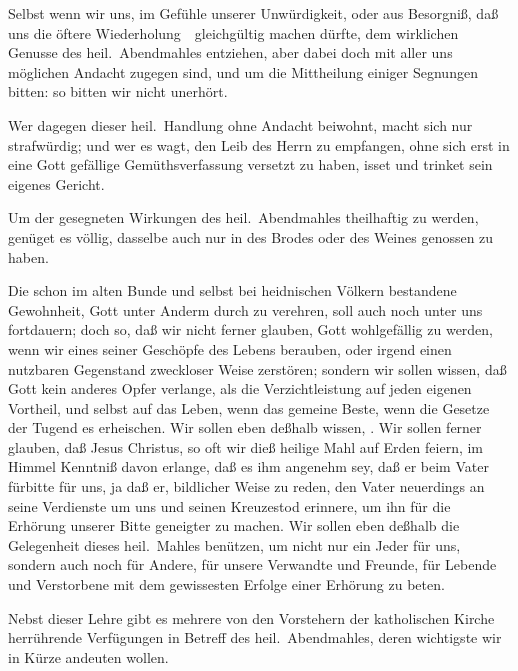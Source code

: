 \begin{aufza}
\item Selbst wenn wir uns, im Gefühle unserer Unwürdigkeit, oder aus Besorgniß, daß uns die öftere Wiederholung~\ gleichgültig machen dürfte, dem wirklichen Genusse des heil.\ Abendmahles entziehen, aber dabei doch mit aller uns möglichen Andacht zugegen sind, und um die Mittheilung einiger Segnungen bitten: so bitten wir nicht unerhört.
\item Wer dagegen dieser heil.\ Handlung ohne Andacht beiwohnt, macht sich nur strafwürdig; und wer es wagt, den Leib des Herrn zu empfangen, ohne sich erst in eine Gott gefällige Gemüthsverfassung versetzt zu haben, isset und trinket sein eigenes Gericht.
\item Um der gesegneten Wirkungen des heil.\ Abendmahles theilhaftig zu werden, genüget es völlig, dasselbe auch nur in  des Brodes oder des Weines genossen zu haben.
\item Die schon im alten Bunde und selbst bei heidnischen Völkern bestandene Gewohnheit, Gott unter Anderm durch  zu verehren, soll auch noch unter uns fortdauern; doch so, daß wir nicht ferner glauben, Gott wohlgefällig zu werden, wenn wir eines seiner Geschöpfe des Lebens berauben, oder irgend einen nutzbaren Gegenstand zweckloser Weise zerstören; sondern wir sollen wissen, daß Gott kein anderes Opfer verlange, als die Verzichtleistung auf jeden eigenen Vortheil, und selbst auf das Leben, wenn das gemeine Beste, wenn die Gesetze der Tugend es erheischen. Wir sollen eben deßhalb wissen, . Wir sollen ferner glauben, daß Jesus Christus, so oft wir dieß heilige Mahl auf Erden feiern, im Himmel Kenntniß davon erlange, daß es ihm angenehm sey, daß er beim Vater fürbitte für uns, ja daß er, bildlicher Weise zu reden, den Vater neuerdings an seine Verdienste um uns und seinen Kreuzestod erinnere, um ihn für die Erhörung unserer Bitte geneigter zu machen. Wir sollen eben deßhalb die Gelegenheit dieses heil.\ Mahles benützen, um nicht nur ein Jeder für uns, sondern auch noch für Andere, für unsere Verwandte und Freunde, für Lebende und Verstorbene mit dem gewissesten Erfolge einer Erhörung zu beten.~
\item Nebst dieser Lehre gibt es mehrere von den Vorstehern der katholischen Kirche herrührende Verfügungen in Betreff des heil.\ Abendmahles, deren wichtigste wir in Kürze andeuten wollen.

\end{aufza}
